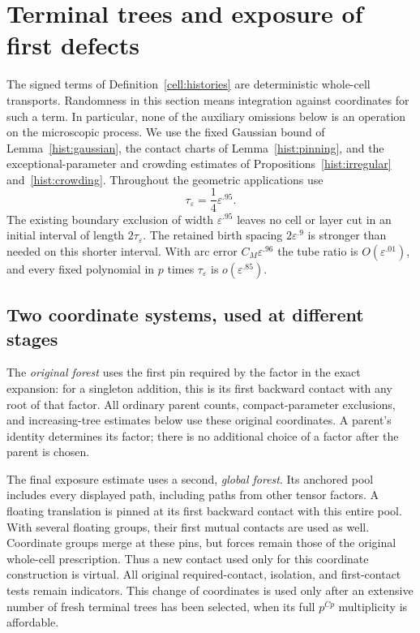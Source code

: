 \section{Terminal trees and exposure of first defects}
\label{exp:section}
\label{sec:exposure}

The signed terms of Definition~\ref{cell:histories} are deterministic
whole-cell transports.  Randomness in this section means integration against
coordinates for such a term.  In particular, none of the auxiliary omissions
below is an operation on the microscopic process.  We use the fixed Gaussian
bound of Lemma~\ref{hist:gaussian}, the contact charts of
Lemma~\ref{hist:pinning}, and the exceptional-parameter and crowding estimates
of Propositions~\ref{hist:irregular} and~\ref{hist:crowding}.
Throughout the geometric applications use
\begin{equation}
\label{exp:time-scale}
 \tau_\varepsilon=\frac14\varepsilon^{.95}.
\end{equation}
The existing boundary exclusion of width $\varepsilon^{.95}$ leaves no
cell or layer cut in an initial interval of length $2\tau_\varepsilon$.
The retained birth spacing $2\varepsilon^{.9}$ is stronger than needed
on this shorter interval.  With arc error $C_M\varepsilon^{.96}$ the tube
ratio is $O(\varepsilon^{.01})$, and every fixed polynomial in $p$ times
$\tau_\varepsilon$ is $o(\varepsilon^{.85})$.

\subsection{Two coordinate systems, used at different stages}

The \emph{original forest} uses the first pin required by the factor in the
exact expansion: for a singleton addition, this is its first backward
contact with any root of that factor.  All ordinary parent counts,
compact-parameter exclusions, and increasing-tree estimates below use
these original coordinates.  A parent's identity determines its factor;
there is no additional choice of a factor after the parent is chosen.

The final exposure estimate uses a second, \emph{global forest}.  Its
anchored pool includes every displayed path, including paths from other
tensor factors.  A floating translation is pinned at its first backward
contact with this entire pool.  With several floating groups, their first
mutual contacts are used as well.  Coordinate groups merge at these pins,
but forces remain those of the original whole-cell prescription.  Thus a
new contact used only for this coordinate construction is virtual.  All
original required-contact, isolation, and first-contact tests remain
indicators.  This change of coordinates is used only after an extensive
number of fresh terminal trees has been selected, when its full
$p^{Cp}$ multiplicity is affordable.

